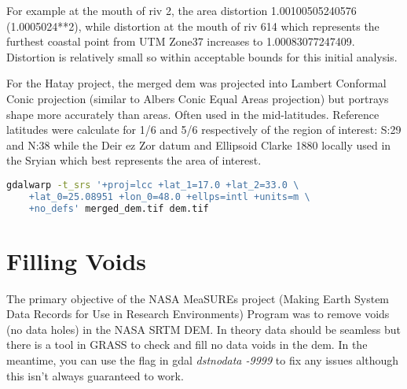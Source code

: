 For example at the mouth of riv 2, the area distortion 1.00100505240576 (1.0005024**2), while distortion at the mouth of riv 614 which represents the furthest coastal point from UTM Zone37 increases to 1.00083077247409. Distortion is relatively small so within acceptable bounds for this initial analysis. 

For the Hatay project, the merged dem was projected into Lambert Conformal Conic projection (similar to Albers Conic Equal Areas projection) but portrays shape more accurately than areas. Often used in the mid-latitudes. Reference latitudes were calculate for 1/6 and 5/6 respectively of the region of interest: S:29 and N:38 while the Deir ez Zor datum and Ellipsoid Clarke 1880 locally used in the Sryian which best represents the area of interest.

\begin{lstlisting}[language=bash]
gdalwarp -t_srs '+proj=lcc +lat_1=17.0 +lat_2=33.0 \
	+lat_0=25.08951 +lon_0=48.0 +ellps=intl +units=m \
	+no_defs' merged_dem.tif dem.tif
\end{lstlisting}




\section{Filling Voids}

The primary objective of the NASA MeaSUREs project (Making Earth System Data Records for Use in Research Environments) Program was to remove voids (no data holes) in the NASA SRTM DEM. In theory data should be seamless but there is a tool in GRASS to check and fill no data voids in the dem. In the meantime, you can use the flag in gdal \textit{dstnodata -9999} to fix any issues although this isn’t always guaranteed to work. 